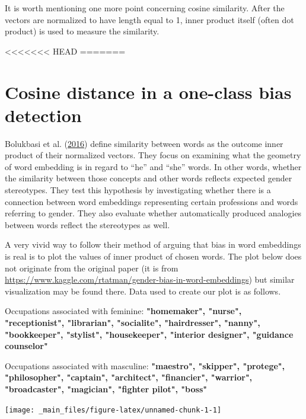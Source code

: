 \documentclass[12pt,]{book}
\begin{document}
It is worth mentioning one more point concerning cosine similarity.
After the vectors are normalized to have length equal to 1, inner
product itself (often dot product) is used to measure the similarity.

<<<<<<< HEAD
=======
\section{Cosine distance in a one-class bias
detection}\label{cosine-distance-in-a-one-class-bias-detection}

Bolukbasi et al. (\protect\hyperlink{ref-Bolukbasi2016Man}{2016}) define
similarity between words as the outcome inner product of their
normalized vectors. They focus on examining what the geometry of word
embedding is in regard to ``he'' and ``she'' words. In other words,
whether the similarity between those concepts and other words reflects
expected gender stereotypes. They test this hypothesis by investigating
whether there is a connection between word embeddings representing
certain professions and words referring to gender. They also evaluate
whether automatically produced analogies between words reflect the
stereotypes as well.

A very vivid way to follow their method of arguing that bias in word
embeddings is real is to plot the values of inner product of chosen
words. The plot below does not originate from the original paper (it is
from
\url{https://www.kaggle.com/rtatman/gender-bias-in-word-embeddings}) but
similar visualization may be found there. Data used to create our plot
is as follows. \newline

Occupations associated with feminine:
\textbf{"homemaker", "nurse", "receptionist", "librarian", "socialite", "hairdresser", "nanny", "bookkeeper", "stylist", "housekeeper", "interior designer", "guidance counselor"}
\newline

Occupations associated with masculine:
\textbf{"maestro", "skipper", "protege", "philosopher", "captain", "architect", "financier", "warrior", "broadcaster", "magician", "fighter pilot", "boss"}
\newline

\vspace{1mm} \footnotesize

\begin{center}\texttt{[image: \_main\_files/figure-latex/unnamed-chunk-1-1]} \end{center}
\end{document}
